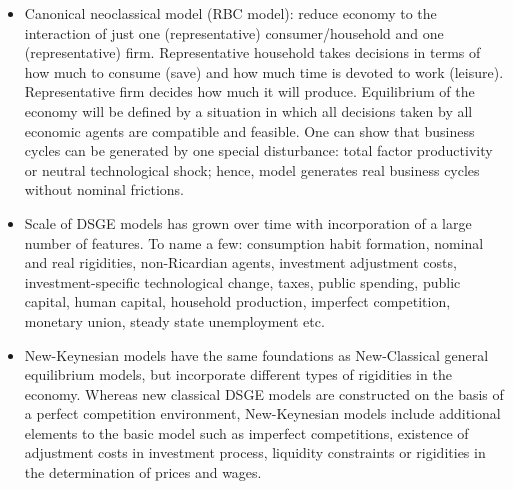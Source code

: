 \begin{Solution}{2}
	\begin{itemize}
		\item Canonical neoclassical model (RBC model): reduce economy to the interaction of just one (representative) consumer/household and one (representative) firm. Representative household takes decisions in terms of how much to consume (save) and how much time is devoted to work (leisure). Representative firm decides how much it will produce. Equilibrium of the economy will be defined by a situation in which all decisions taken by all economic agents are compatible and feasible. One can show that business cycles can be generated by one special disturbance: total factor productivity or neutral technological shock; hence, model generates real business cycles without nominal frictions.
		\item Scale of DSGE models has grown over time with incorporation of a large number of features. To name a few: consumption habit formation, nominal and real rigidities, non-Ricardian agents, investment adjustment costs, investment-specific technological change, taxes, public spending, public capital, human capital, household production, imperfect competition, monetary union, steady state unemployment etc.
		\item New-Keynesian models have the same foundations as New-Classical general equilibrium models, but incorporate different types of rigidities in the economy. Whereas new classical DSGE models are constructed on the basis of a perfect competition environment, New-Keynesian models include additional elements to the basic model such as imperfect competitions, existence of adjustment costs in investment process, liquidity constraints or rigidities in the determination of prices and wages.
	\end{itemize}
	
\end{Solution}
